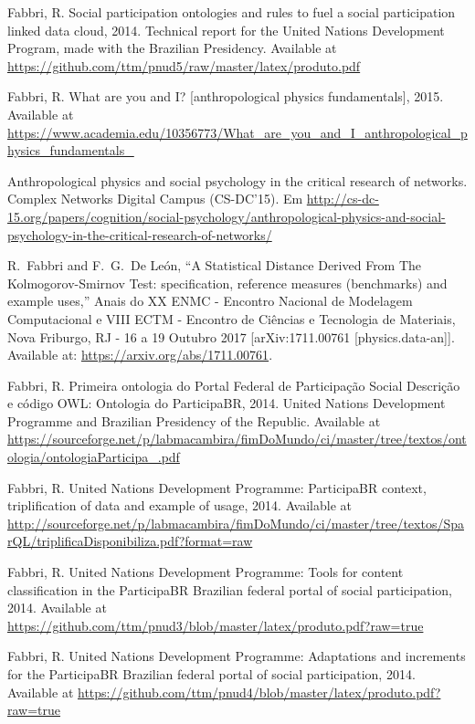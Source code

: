 \documentclass[letterpaper,10pt]{article}
\begin{document}
\begin{thebibliography}{99}
Fabbri, R. Social participation ontologies and rules to fuel a social participation linked data cloud, 2014.
	Technical report for the United Nations Development Program, made with the Brazilian Presidency.
		Available at \url{https://github.com/ttm/pnud5/raw/master/latex/produto.pdf}

	Fabbri, R. What are you and I? [anthropological physics fundamentals], 2015. Available at \url{https://www.academia.edu/10356773/What\_are\_you\_and\_I\_anthropological\_physics\_fundamentals\_}

	Anthropological physics and social psychology in the critical research of networks. Complex Networks Digital Campus (CS-DC'15).
	Em \url{http://cs-dc-15.org/papers/cognition/social-psychology/anthropological-physics-and-social-psychology-in-the-critical-research-of-networks/}

  R.~Fabbri and F.~G.~De León,
  ``A Statistical Distance Derived From The Kolmogorov-Smirnov Test: specification, reference measures (benchmarks) and example uses,''
  Anais do XX ENMC - Encontro Nacional de Modelagem Computacional e
  VIII ECTM - Encontro de Ci\^encias e Tecnologia de Materiais, Nova Friburgo,
  RJ - 16 a 19 Outubro 2017
		[arXiv:1711.00761 [physics.data-an]]. Available at: \url{https://arxiv.org/abs/1711.00761}.

	Fabbri, R. Primeira ontologia do Portal Federal de Participação Social Descrição e código OWL: Ontologia do ParticipaBR, 2014.
    United Nations Development Programme and Brazilian Presidency of the Republic. Available at \url{https://sourceforge.net/p/labmacambira/fimDoMundo/ci/master/tree/textos/ontologia/ontologiaParticipa\_.pdf}

    Fabbri, R. United Nations Development Programme: ParticipaBR context, triplification of data and example of usage, 2014.
    Available at \url{http://sourceforge.net/p/labmacambira/fimDoMundo/ci/master/tree/textos/SparQL/triplificaDisponibiliza.pdf?format=raw}

    Fabbri, R. United Nations Development Programme: Tools for content classification in the ParticipaBR Brazilian federal portal of social participation, 2014.
    Available at \url{https://github.com/ttm/pnud3/blob/master/latex/produto.pdf?raw=true}

    Fabbri, R. United Nations Development Programme: Adaptations and increments for the ParticipaBR Brazilian federal portal of social participation, 2014.
    Available at \url{https://github.com/ttm/pnud4/blob/master/latex/produto.pdf?raw=true}


\end{thebibliography}
\end{document}
